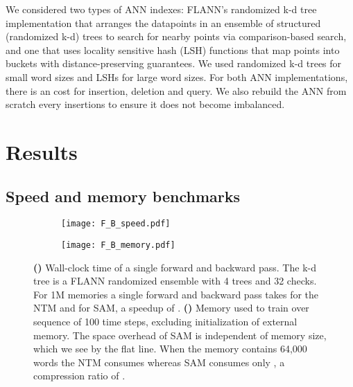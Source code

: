 \documentclass{article}
\begin{document}
We considered two types of ANN indexes: FLANN's randomized k-d tree implementation \cite{flann_pami_2014} that arranges the datapoints in an ensemble of structured (randomized k-d) trees to search for nearby points via comparison-based search, and one that uses locality sensitive hash (LSH) functions that map points into buckets with distance-preserving guarantees. We used randomized k-d trees for small word sizes and LSHs for large word sizes.
For both ANN implementations, there is an  cost for insertion, deletion and query. We also rebuild the ANN from scratch every  insertions to ensure it does not become imbalanced.



























\section{Results}

\label{sec:results}




\subsection{Speed and memory benchmarks}

\begin{figure*}[h]
    \centering
\begin{subfigure}{0.47\textwidth}
    \texttt{[image: F\_B\_speed.pdf]}
    \caption{ \label{sf:speed}}
    \end{subfigure}
\begin{subfigure}{0.47\textwidth}
    \texttt{[image: F\_B\_memory.pdf]}
    \caption{ \label{sf:memory}}
    \end{subfigure}
\caption{\textbf{()} Wall-clock time of a single forward and backward pass. The k-d tree is a FLANN randomized ensemble with 4 trees and 32 checks. For 1M memories a single forward and backward pass takes  for the NTM and  for SAM, a speedup of .
    \textbf{()} Memory used to train over sequence of 100 time steps, excluding initialization of external memory. The space overhead of SAM is independent of memory size, which we see by the flat line. When the memory contains 64,000 words the NTM consumes  whereas SAM consumes only , a compression ratio of .}
    \label{fig:perf_benchmarks}
\end{figure*}
\end{document}
